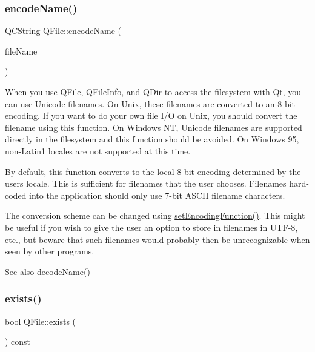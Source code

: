 \subsubsection{\texorpdfstring{encodeName()}{encodeName()}}
{\footnotesize\ttfamily \mbox{\hyperlink{class_q_c_string}{Q\+C\+String}} Q\+File\+::encode\+Name (\begin{DoxyParamCaption}\item[{const \mbox{\hyperlink{class_q_string}{Q\+String}} \&}]{file\+Name }\end{DoxyParamCaption})\hspace{0.3cm}{\ttfamily [static]}}

When you use \mbox{\hyperlink{class_q_file}{Q\+File}}, \mbox{\hyperlink{class_q_file_info}{Q\+File\+Info}}, and \mbox{\hyperlink{class_q_dir}{Q\+Dir}} to access the filesystem with Qt, you can use Unicode filenames. On Unix, these filenames are converted to an 8-\/bit encoding. If you want to do your own file I/O on Unix, you should convert the filename using this function. On Windows NT, Unicode filenames are supported directly in the filesystem and this function should be avoided. On Windows 95, non-\/\+Latin1 locales are not supported at this time.

By default, this function converts to the local 8-\/bit encoding determined by the user\textquotesingle{}s locale. This is sufficient for filenames that the user chooses. Filenames hard-\/coded into the application should only use 7-\/bit A\+S\+C\+II filename characters.

The conversion scheme can be changed using \mbox{\hyperlink{class_q_file_a634585187a63a52cc02d7c4578492666}{set\+Encoding\+Function()}}. This might be useful if you wish to give the user an option to store in filenames in U\+T\+F-\/8, etc., but beware that such filenames would probably then be unrecognizable when seen by other programs.

\begin{DoxySeeAlso}{See also}
\mbox{\hyperlink{class_q_file_ad9bf876589a366445a443cb8c7ef4df4}{decode\+Name()}} 
\end{DoxySeeAlso}
\mbox{\label{class_q_file_ad3329694f62a9bb5730f6ba709f8b7cc}} 
\subsubsection{\texorpdfstring{exists()}{exists()}\hspace{0.1cm}{\footnotesize\ttfamily [1/2]}}
{\footnotesize\ttfamily bool Q\+File\+::exists (\begin{DoxyParamCaption}{ }\end{DoxyParamCaption}) const}

